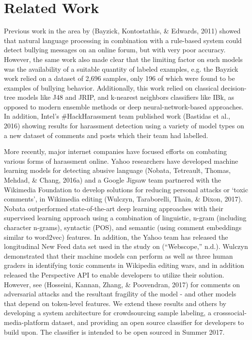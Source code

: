 \documentclass[11pt,a4paper]{article}
\begin{document}
\section{Related Work}

Previous work in the area by (Bayzick, Kontostathis,
\& Edwards, 2011) showed that natural language
processing in combination with a rule-based
system could detect bullying messages on an
online forum, but with very poor accuracy. However,
the same work also made clear that the limiting
factor on such models was the availability of a
suitable quantity of labeled examples, e.g. the
Bayzick work relied on a dataset of 2,696 samples,
only 196 of which were found to be examples of
bullying behavior. Additionally, this work relied
on classical decision-tree models like J48 and
JRIP, and k-nearest neighbors classifiers like IBk,
as opposed to modern ensemble methods or deep
neural-network-based approaches. In addition, Intel's
\#HackHarassment team published work (Bastidas
et al., 2016) showing results for harassment
detection using a variety of model types on a new
dataset of comments and posts which their team
had labelled.

More recently, major internet companies have
focused efforts on combating various forms of harassment
online. Yahoo researchers have developed
machine learning models for detecting abusive
language (Nobata, Tetreault, Thomas, Mehdad, \&
Chang, 2016a) and a Google Jigsaw team partnered
with the Wikimedia Foundation to develop
solutions for reducing personal attacks or ‘toxic
comments’, in Wikimedia editing (Wulczyn,
Taraborelli, Thain, \& Dixon, 2017). Nobata outperformed
state-of-the-art deep learning approaches
with their supervised learning approach
using a combination of linguistic, n-gram (including
character n-grams), syntactic (POS), and semantic
(using comment embeddings similar to
word2vec) features. In addition, the Yahoo team
has released the longitudinal New Feed data set
used in the study on (“Webscope,” n.d.). Wulczyn
demonstrated that their machine models can perform
as well as three human graders in identifying
toxic comments in Wikipedia editing wars, and in
addition released the Perspective API to enable developers
to utilize their solution. However, see
(Hosseini, Kannan, Zhang, \& Poovendran, 2017)
for comments on adversarial attacks and the resultant
fragility of the model - and other models that
depend on token-level features. We extend these
results and others by developing a system architecture
for crowdsourcing sample labeling, a crosssocial-media-platform
dataset, and providing an
open source classifier for developers to build upon.
The classifier is intended to be open sourced in
Summer 2017.
\end{document}
